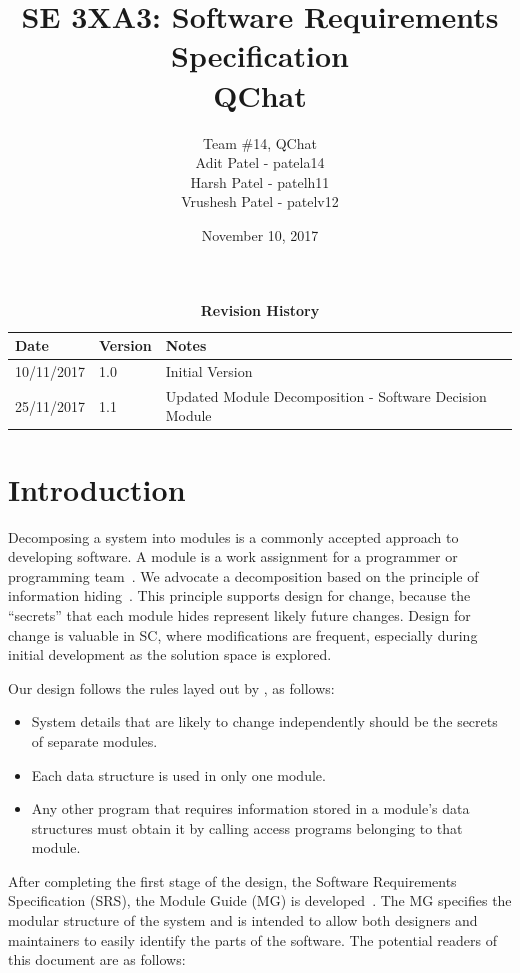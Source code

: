 \documentclass[12pt, titlepage]{article}
\title{SE 3XA3: Software Requirements Specification\\QChat}
\author{Team \#14, QChat
		\\ Adit Patel - patela14
		\\ Harsh Patel - patelh11
		\\ Vrushesh Patel - patelv12
}
\date{November 10, 2017}
\begin{document}
\maketitle

\tableofcontents
\listoftables
\listoffigures

\begin{table}[bp]
\caption{\bf Revision History}
\begin{tabularx}{\textwidth}{p{3cm}p{2cm}X}
\toprule {\bf Date} & {\bf Version} & {\bf Notes}\\
\midrule
10/11/2017 & 1.0 & Initial Version\\
25/11/2017 & 1.1 & Updated Module Decomposition - Software Decision Module\\
\bottomrule
\end{tabularx}
\end{table}

\newpage


\section{Introduction}

Decomposing a system into modules is a commonly accepted approach to developing
software.  A module is a work assignment for a programmer or programming
team~\citep{ParnasEtAl1984}.  We advocate a decomposition
based on the principle of information hiding~\citep{Parnas1972a}.  This
principle supports design for change, because the ``secrets'' that each module
hides represent likely future changes.  Design for change is valuable in SC,
where modifications are frequent, especially during initial development as the
solution space is explored.  

Our design follows the rules layed out by \citet{ParnasEtAl1984}, as follows:
\begin{itemize}
\item System details that are likely to change independently should be the
  secrets of separate modules.
\item Each data structure is used in only one module.
\item Any other program that requires information stored in a module's data
  structures must obtain it by calling access programs belonging to that module.
\end{itemize}

After completing the first stage of the design, the Software Requirements
Specification (SRS), the Module Guide (MG) is developed~\citep{ParnasEtAl1984}. The MG
specifies the modular structure of the system and is intended to allow both
designers and maintainers to easily identify the parts of the software.  The
potential readers of this document are as follows:
\end{document}
